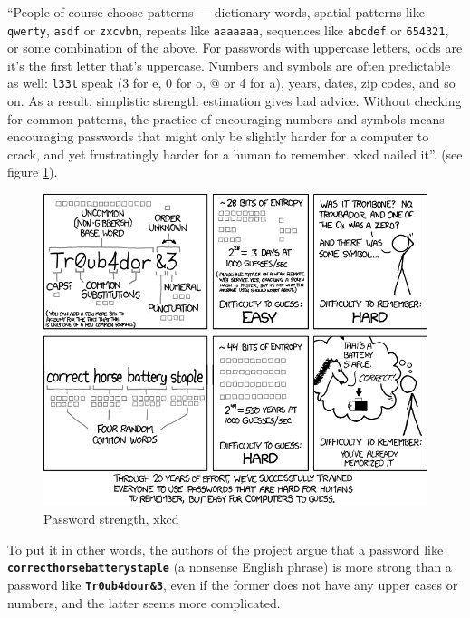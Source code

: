 ``People of course choose patterns — dictionary words, spatial patterns like \texttt{qwerty}, \texttt{asdf} or \texttt{zxcvbn}, repeats like \texttt{aaaaaaa}, sequences like \texttt{abcdef} or \texttt{654321}, or some combination of the above. For passwords with uppercase letters, odds are it’s the first letter that’s uppercase. Numbers and symbols are often predictable as well: \texttt{l33t} speak (3 for e, 0 for o, @ or 4 for a), years, dates, zip codes, and so on.
As a result, simplistic strength estimation gives bad advice. Without checking for common patterns, the practice of encouraging numbers and symbols means encouraging passwords that might only be slightly harder for a computer to crack, and yet frustratingly harder for a human to remember. xkcd nailed it''. (see figure \ref{fig:xkcd}). \cite{zxdropbox}

\begin{figure}[htb]
  \centering
  \captionsetup{justification=centering}
  \includegraphics[width=\columnwidth]{chapters/figures/development/xkcd.png}
  \caption{Password strength, xkcd \cite{xkcd}}
  \label{fig:xkcd}
\end{figure}

To put it in other words, the authors of the project argue that a password like \texttt{\textbf{correcthorsebatterystaple}} (a nonsense English phrase) is more strong than a password like \texttt{\textbf{Tr0ub4dour\&3}}, even if the former does not have any upper cases or numbers, and the latter seems more complicated.

